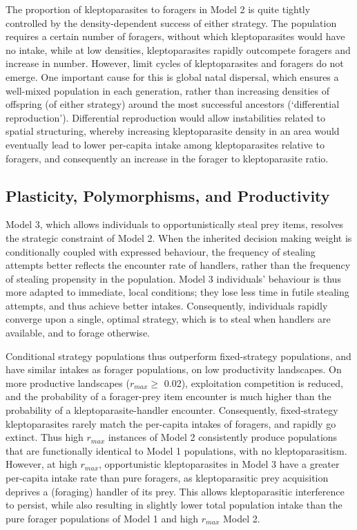 \documentclass[11pt]{article}
\begin{document}
The proportion of kleptoparasites to foragers in Model 2 is quite tightly controlled by the density-dependent success of either strategy.
The population requires a certain number of foragers, without which kleptoparasites would have no intake, while at low densities, kleptoparasites rapidly outcompete foragers and increase in number.
However, limit cycles of kleptoparasites and foragers do not emerge.
One important cause for this is global natal dispersal, which ensures a well-mixed population in each generation, rather than increasing densities of offspring (of either strategy) around the most successful ancestors (`differential reproduction').
Differential reproduction would allow instabilities related to spatial structuring, whereby increasing  kleptoparasite density in an area would eventually lead to lower per-capita intake among kleptoparasites relative to foragers, and consequently an increase in the forager to kleptoparasite ratio.

\subsection{Plasticity, Polymorphisms, and Productivity}

Model 3, which allows individuals to opportunistically steal prey items, resolves the strategic constraint of Model 2.
When the inherited decision making weight is conditionally coupled with expressed behaviour, the frequency of stealing attempts better reflects the encounter rate of handlers, rather than the frequency of stealing propensity in the population.
Model 3 individuals' behaviour is thus more adapted to immediate, local conditions; they lose less time in futile stealing attempts, and thus achieve better intakes.
Consequently, individuals rapidly converge upon a single, optimal strategy, which is to steal when handlers are available, and to forage otherwise.

Conditional strategy populations thus outperform fixed-strategy populations, and have similar intakes as forager populations, on low productivity landscapes.
On more productive landscapes ($r_{max} \geq$ 0.02), exploitation competition is reduced, and the probability of a forager-prey item encounter is much higher than the probability of a kleptoparasite-handler encounter.
Consequently, fixed-strategy kleptoparasites rarely match the per-capita intakes of foragers, and rapidly go extinct.
Thus high $r_{max}$ instances of Model 2 consistently produce populations that are functionally identical to Model 1 populations, with no kleptoparasitism.
However, at high $r_{max}$, opportunistic kleptoparasites in Model 3 have a greater per-capita intake rate than pure foragers, as kleptoparasitic prey acquisition deprives a (foraging) handler of its prey. 
This allows kleptoparasitic interference to persist, while also resulting in slightly lower total population intake than the pure forager populations of Model 1 and high $r_{max}$ Model 2.
\end{document}
